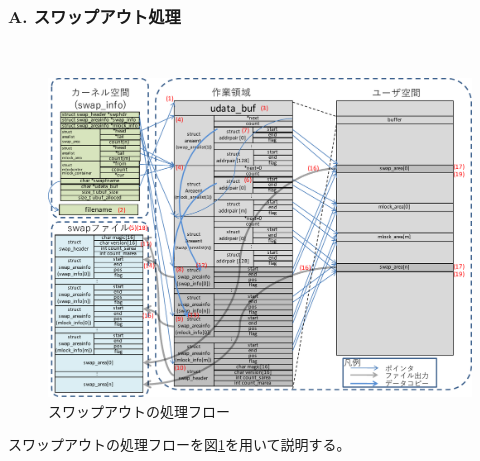 \documentclass[twoside,11pt,fleqn]{book}
\begin{document}
\subsubsection*{A. スワップアウト処理}{\quad}\\
%
\begin{figure}[!h]
\centering
\includegraphics[width=0.90\linewidth]{figs/pageout.pdf}
\vspace{-0em}\caption{スワップアウトの処理フロー}
\label{fig:pageout}
\vspace{-0em}
\end{figure}
\FloatBarrier
%
スワップアウトの処理フローを図\ref{fig:pageout}を用いて説明する。
\end{document}
